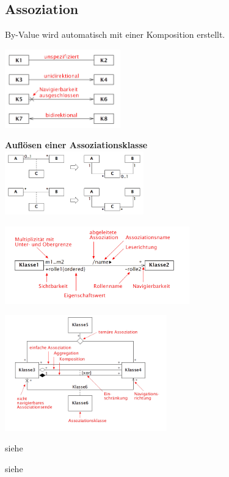 \subsection{Assoziation }
  By-Value wird automatisch mit einer Komposition erstellt.
  \begin{description}[leftmargin=3.5cm]
    \item[Navigierbarkeit]
      \parbox{5cm}{\includegraphics[width=5cm]{./bilder/Navigierbarkeit.png}}
      \hspace{3cm}
      \parbox{8cm}{
      \textbf{Auflösen einer Assoziationsklasse}\\
      \includegraphics[width = 6cm]{./bilder/Aufloesen_Assoziationsklasse}}
      
    \item[Notation]
      \parbox{8cm}{\includegraphics[width=8cm]{./bilder/Notation_Assozi_1.png}}
      \parbox{7cm}{\includegraphics[width=7cm]{./bilder/Notation_Assozi_2.png}}
    \item[Eigenschaftswerte]
      siehe 
    \item[Implementation]
      siehe 
  \end{description}

